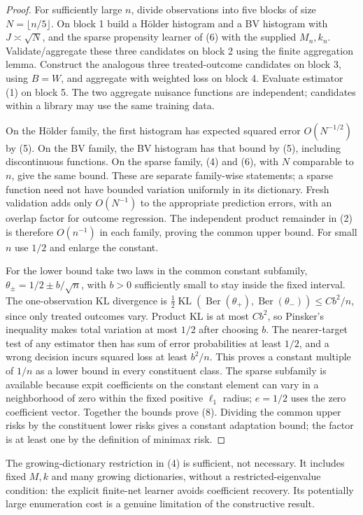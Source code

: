 \documentclass[11pt]{article}
\theoremstyle{definition}
\begin{document}
\begin{proof}
For sufficiently large $n$, divide observations into five blocks of
size $N=\lfloor n/5\rfloor$. On block 1 build a H\"older histogram
and a BV histogram with $J\asymp\sqrt N$, and the sparse propensity
learner of (6) with the supplied $M_n,k_n$. Validate/aggregate these
three candidates on block 2 using the finite aggregation lemma.
Construct the analogous three treated-outcome candidates on block 3,
using $B=W$, and aggregate with weighted loss on block 4. Evaluate
estimator (1) on block 5. The two aggregate nuisance functions are
independent; candidates within a library may use the same training data.

On the H\"older family, the first histogram has expected squared error
$O(N^{-1/2})$ by (5). On the BV family, the BV histogram has that bound
by (5), including discontinuous functions. On the sparse family, (4)
and (6), with $N$ comparable to $n$, give the same bound. These are
separate family-wise statements; a sparse function need not have bounded
variation uniformly in its dictionary. Fresh validation adds only
$O(N^{-1})$ to the appropriate prediction errors, with an overlap factor
for outcome regression. The independent product remainder in (2) is
therefore $O(n^{-1})$ in each family, proving the common upper bound.
For small $n$ use $1/2$ and enlarge the constant.

For the lower bound take two laws in the common constant subfamily,
$\theta_\pm=1/2\pm b/\sqrt n$, with $b>0$ sufficiently small to stay
inside the fixed interval. The one-observation KL divergence is
$\tfrac12\operatorname{KL}(\operatorname{Ber}(\theta_+),
\operatorname{Ber}(\theta_-))\le Cb^2/n$, since only treated outcomes
vary. Product KL is at most $Cb^2$, so Pinsker's inequality makes total
variation at most $1/2$ after choosing $b$. The nearer-target test of any
estimator then has sum of error probabilities at least $1/2$, and a
wrong decision incurs squared loss at least $b^2/n$. This proves a
constant multiple of $1/n$ as a lower bound in every constituent class.
The sparse subfamily is available because expit coefficients on the
constant element can vary in a neighborhood of zero within the fixed
positive $\ell_1$ radius; $e=1/2$ uses the zero coefficient vector.
Together the bounds prove (8). Dividing the common upper risks by the
constituent lower risks gives a constant adaptation bound; the factor
is at least one by the definition of minimax risk.
\end{proof}

The growing-dictionary restriction in (4) is sufficient, not necessary.
It includes fixed $M,k$ and many growing dictionaries, without a
restricted-eigenvalue condition: the explicit finite-net learner avoids
coefficient recovery. Its potentially large enumeration cost is a genuine
limitation of the constructive result.
\end{document}

